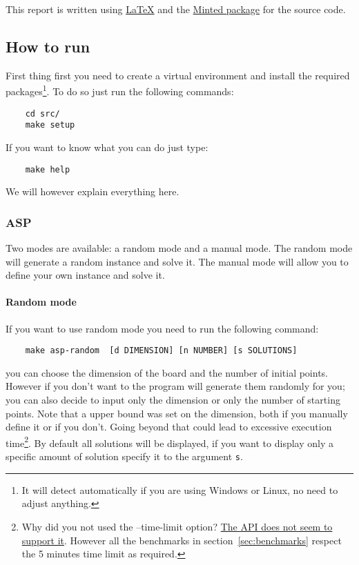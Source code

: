 This report is written using \href{https://www.latex-project.org/}{LaTeX} and the \href{https://ctan.org/pkg/minted?lang=en}{Minted package} for the source code.


\subsection{How to run}
First thing first you need to create a virtual environment and install the required packages\footnote{It will detect automatically if you are using Windows or Linux, no need to adjust anything.}. To do so just run the following commands:
\begin{verbatim}
    cd src/
    make setup
\end{verbatim}

If you want to know what you can do just type:

\begin{verbatim}
    make help 
\end{verbatim}

We will however explain everything here.

\subsubsection{ASP}
Two modes are available: a random mode and a manual mode. The random mode will generate a random instance and solve it. The manual mode will allow you to define your own instance and solve it.

\paragraph{Random mode}

If you want to use random mode you need to run the following command:
\begin{verbatim}
    make asp-random  [d DIMENSION] [n NUMBER] [s SOLUTIONS]
\end{verbatim}

you can choose the dimension of the board and the number of initial points. However if you don't want to the program will generate them randomly for you; you can also decide to input only the dimension or only the number of starting points. Note that a upper bound was set on the dimension, both if you manually define it or if you don't. Going beyond that could lead to excessive execution time\footnote{Why did you not used the --time-limit option? \href{https://github.com/potassco/clingo/issues/151}{The API does not seem to support it}. However all the benchmarks in section~\ref{sec:benchmarks} respect the 5 minutes time limit as required.}.
By default all solutions will be displayed, if you want to display only a specific amount of solution specify it to the argument \texttt{s}. 

